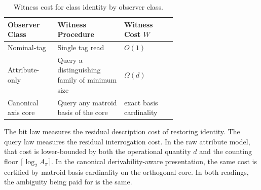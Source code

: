 \begin{table}[h]
\centering
\small
\begin{tabular}{|>{\raggedright\arraybackslash}p{0.18\linewidth}|>{\raggedright\arraybackslash}p{0.28\linewidth}|>{\raggedright\arraybackslash}p{0.20\linewidth}|}
\hline
\textbf{Observer Class} & \textbf{Witness Procedure} & \textbf{Witness Cost $W$} \\
\hline
Nominal-tag & Single tag read & $O(1)$ \\
Attribute-only & Query a distinguishing family of minimum size & $\Omega(d)$ \\
Canonical axis core & Query any matroid basis of the core & exact basis cardinality \\
\hline
\end{tabular}
\vspace{3pt}
\caption{Witness cost for class identity by observer class.}
\label{tab:witness-comparison}
\end{table}

\begin{remark}
The bit law measures the residual description cost of restoring identity. The query law measures the residual interrogation cost. In the raw attribute model, that cost is lower-bounded by both the operational quantity $d$ and the counting floor $\lceil \log_2 A_{\pi} \rceil$. In the canonical derivability-aware presentation, the same cost is certified by matroid basis cardinality on the orthogonal core. In both readings, the ambiguity being paid for is the same.
\end{remark}
